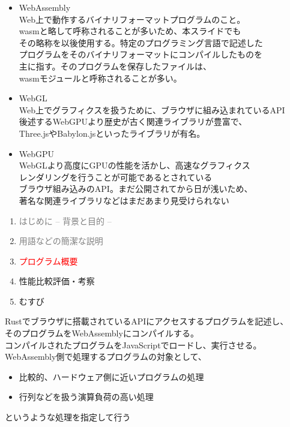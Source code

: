 \begin{itemize}
	\item WebAssembly\\Web上で動作するバイナリフォーマットプログラムのこと。\\wasmと略して呼称されることが多いため、本スライドでも\\その略称を以後使用する。特定のプログラミング言語で記述した\\プログラムをそのバイナリフォーマットにコンパイルしたものを\\主に指す。そのプログラムを保存したファイルは、\\wasmモジュールと呼称されることが多い。
	\newpage
	
	\item WebGL\\Web上でグラフィクスを扱うために、ブラウザに組み込まれているAPI\\後述するWebGPUより歴史が古く関連ライブラリが豊富で、\\Three.jsやBabylon.jsといったライブラリが有名。
	
	\item WebGPU\\WebGLより高度にGPUの性能を活かし、高速なグラフィクス\\レンダリングを行うことが可能であるとされている\\ブラウザ組み込みのAPI。まだ公開されてから日が浅いため、\\著名な関連ライブラリなどはまだあまり見受けられない
\end{itemize}
\newpage
\begin{enumerate}[itemsep=0.25\zh]
	\item \textcolor{gray}{はじめに -- 背景と目的 --}
	\item \textcolor{gray}{用語などの簡潔な説明}
	\item \textcolor{red}{プログラム概要}
	\item 性能比較評価・考察
	\item むすび
\end{enumerate}
\newpage


Rustでブラウザに搭載されているAPIにアクセスするプログラムを記述し、\\そのプログラムをWebAssemblyにコンパイルする。\\コンパイルされたプログラムをJavaScriptでロードし、実行させる。\\
WebAssembly側で処理するプログラムの対象として、
\begin{itemize}
	\item 比較的、ハードウェア側に近いプログラムの処理
	\item 行列などを扱う演算負荷の高い処理
\end{itemize}
というような処理を指定して行う


